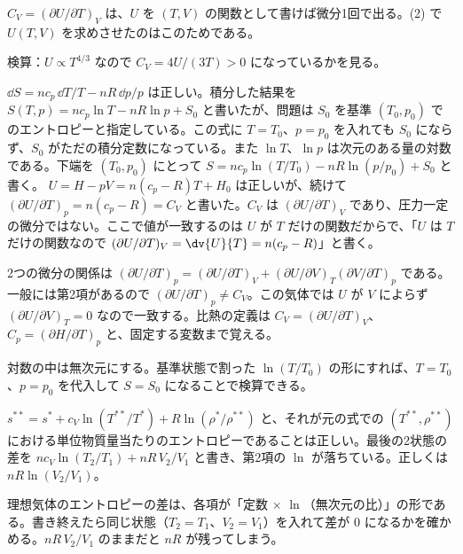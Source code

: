 \begin{rikai}
  \item $C_{V}=(\partial U/\partial T)_{V}$ は、$U$ を $(T,V)$ の関数として書けば微分1回で出る。(2) で $U(T,V)$ を求めさせたのはこのためである。
  \item 検算：$U\propto T^{4/3}$ なので $C_{V}=4U/(3T)>0$ になっているかを見る。
\end{rikai}
\begin{kotaeran}
   $\dd S=nc_{p}\,\dd T/T-nR\,\dd p/p$ は正しい。積分した結果を $S(T,p)=nc_{p}\ln T-nR\ln p+S_{0}$ と書いたが、問題は $S_{0}$ を基準 $(T_{0},p_{0})$ でのエントロピーと指定している。この式に $T=T_{0}$、$p=p_{0}$ を入れても $S_{0}$ にならず、$S_{0}$ がただの積分定数になっている。また $\ln T$、$\ln p$ は次元のある量の対数である。下端を $(T_{0},p_{0})$ にとって $S=nc_{p}\ln(T/T_{0})-nR\ln(p/p_{0})+S_{0}$ と書く。
   $U=H-pV=n(c_{p}-R)T+H_{0}$ は正しいが、続けて $(\partial U/\partial T)_{p}=n(c_{p}-R)=C_{V}$ と書いた。$C_{V}$ は $(\partial U/\partial T)_{V}$ であり、圧力一定の微分ではない。ここで値が一致するのは $U$ が $T$ だけの関数だからで、「$U$ は $T$ だけの関数なので $(\partial U/\partial T)_{V}=\dv{U}{T}=n(c_{p}-R)$」と書く。
\end{kotaeran}
\begin{rikai}
  \item 2つの微分の関係は $(\partial U/\partial T)_{p}=(\partial U/\partial T)_{V}+(\partial U/\partial V)_{T}(\partial V/\partial T)_{p}$ である。一般には第2項があるので $(\partial U/\partial T)_{p}\neq C_{V}$。この気体では $U$ が $V$ によらず $(\partial U/\partial V)_{T}=0$ なので一致する。比熱の定義は $C_{V}=(\partial U/\partial T)_{V}$、$C_{p}=(\partial H/\partial T)_{p}$ と、固定する変数まで覚える。
  \item 対数の中は無次元にする。基準状態で割った $\ln(T/T_{0})$ の形にすれば、$T=T_{0}$、$p=p_{0}$ を代入して $S=S_{0}$ になることで検算できる。
\end{rikai}
\begin{kotaeran}
   $s^{**}=s^{*}+c_{V}\ln(T^{**}/T^{*})+R\ln(\rho^{*}/\rho^{**})$ と、それが元の式での $(T^{**},\rho^{**})$ における単位物質量当たりのエントロピーであることは正しい。最後の2状態の差を $nc_{V}\ln(T_{2}/T_{1})+nR\,V_{2}/V_{1}$ と書き、第2項の $\ln$ が落ちている。正しくは $nR\ln(V_{2}/V_{1})$。
\end{kotaeran}
\begin{rikai}
  \item 理想気体のエントロピーの差は、各項が「定数 $\times$ $\ln$（無次元の比）」の形である。書き終えたら同じ状態（$T_{2}=T_{1}$、$V_{2}=V_{1}$）を入れて差が $0$ になるかを確かめる。$nR\,V_{2}/V_{1}$ のままだと $nR$ が残ってしまう。
\end{rikai}
